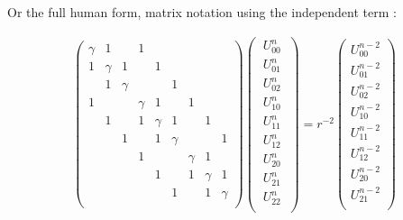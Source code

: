 \documentclass[legalpaper, 12pt]{article}
\begin{document}
Or the full human form, matrix notation using the independent term :

\begin{eqnarray}
\begin{pmatrix}
\gamma   &    1    &         &    1    &         &         &         &         &         \\ 
    1    & \gamma  &     1   &         &     1   &         &         &         &         \\ 
         &    1    & \gamma  &         &         &    1    &         &         &         \\ 
    1    &         &         & \gamma  &    1    &         &    1    &         &         \\ 
         &    1    &         &    1    & \gamma  &    1    &         &    1    &         \\ 
         &         &    1    &         &    1    & \gamma  &         &         &    1    \\ 
         &         &         &    1    &         &         & \gamma  &    1    &         \\ 
         &         &         &         &    1    &         &    1    & \gamma  &    1    \\ 
         &         &         &         &         &    1    &         &    1    & \gamma  \\
\end{pmatrix} 
\begin{pmatrix}
 \ U_{00}^n \ \\
 \ U_{01}^n \ \\ 
 \ U_{02}^n \ \\ 
 \ U_{10}^n \ \\ 
 \ U_{11}^n \ \\ 
 \ U_{12}^n \ \\ 
 \ U_{20}^n \ \\ 
 \ U_{21}^n \ \\ 
 \ U_{22}^n \ \\ 
\end{pmatrix}
=
r^{-2} 
\begin{pmatrix}
U_{00}^{n-2} \\
U_{01}^{n-2} \\ 
U_{02}^{n-2} \\ 
U_{10}^{n-2} \\ 
U_{11}^{n-2} \\ 
U_{12}^{n-2} \\ 
U_{20}^{n-2} \\ 
U_{21}^{n-2} \\ 

\end{pmatrix}
\end{eqnarray}
\end{document}
